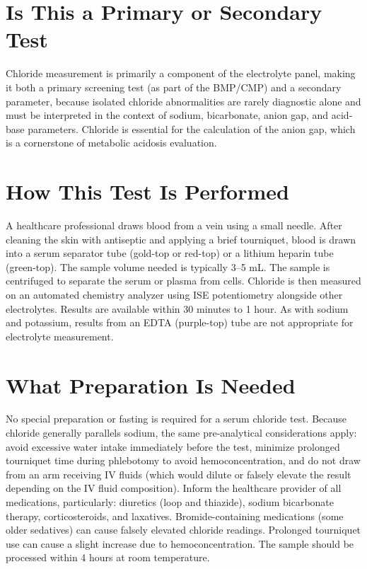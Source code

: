 \section*{Is This a Primary or Secondary Test}
Chloride measurement is primarily a component of the electrolyte panel, making it both a primary screening test (as part of the BMP/CMP) and a secondary parameter, because isolated chloride abnormalities are rarely diagnostic alone and must be interpreted in the context of sodium, bicarbonate, anion gap, and acid-base parameters. Chloride is essential for the calculation of the anion gap, which is a cornerstone of metabolic acidosis evaluation.

\section*{How This Test Is Performed}
A healthcare professional draws blood from a vein using a small needle. After cleaning the skin with antiseptic and applying a brief tourniquet, blood is drawn into a serum separator tube (gold-top or red-top) or a lithium heparin tube (green-top). The sample volume needed is typically 3--5 mL. The sample is centrifuged to separate the serum or plasma from cells. Chloride is then measured on an automated chemistry analyzer using ISE potentiometry alongside other electrolytes. Results are available within 30 minutes to 1 hour. As with sodium and potassium, results from an EDTA (purple-top) tube are not appropriate for electrolyte measurement.

\section*{What Preparation Is Needed}
No special preparation or fasting is required for a serum chloride test. Because chloride generally parallels sodium, the same pre-analytical considerations apply: avoid excessive water intake immediately before the test, minimize prolonged tourniquet time during phlebotomy to avoid hemoconcentration, and do not draw from an arm receiving IV fluids (which would dilute or falsely elevate the result depending on the IV fluid composition). Inform the healthcare provider of all medications, particularly: diuretics (loop and thiazide), sodium bicarbonate therapy, corticosteroids, and laxatives. Bromide-containing medications (some older sedatives) can cause falsely elevated chloride readings. Prolonged tourniquet use can cause a slight increase due to hemoconcentration. The sample should be processed within 4 hours at room temperature.

